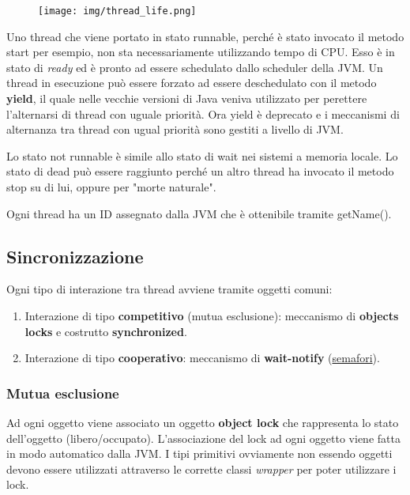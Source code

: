 \documentclass{article}
\begin{document}
\begin{figure}[h!]
    \begin{center}
        \texttt{[image: img/thread\_life.png]}     
    \end{center}
\end{figure}

\noindent Uno thread che viene portato in stato runnable, perché è stato invocato il metodo start per esempio, non sta necessariamente utilizzando tempo di CPU. Esso è 
in stato di \textit{ready} ed è pronto ad essere schedulato dallo scheduler della JVM. Un thread in esecuzione può essere forzato ad essere deschedulato con il metodo \textbf{yield},
il quale nelle vecchie versioni di Java veniva utilizzato per perettere l'alternarsi di thread con uguale priorità. Ora yield è deprecato e i meccanismi di alternanza tra thread 
con ugual priorità sono gestiti a livello di JVM.

\noindent Lo stato not runnable è simile allo stato di wait nei sistemi a memoria locale. Lo stato di dead può essere raggiunto perché un altro thread ha invocato il metodo stop 
su di lui, oppure per "morte naturale".
\medskip

\noindent Ogni thread ha un ID assegnato dalla JVM che è ottenibile tramite getName().

\subsection{Sincronizzazione}
\noindent Ogni tipo di interazione tra thread avviene tramite oggetti comuni:
\begin{enumerate}
    \item Interazione di tipo \textbf{competitivo} (mutua esclusione): meccanismo di \textbf{objects locks} e costrutto \textbf{synchronized}.
    \item Interazione di tipo \textbf{cooperativo}: meccanismo di \textbf{wait-notify} (\underline{semafori}).
\end{enumerate}

\subsubsection{Mutua esclusione}
\noindent Ad ogni oggetto viene associato un oggetto \textbf{object lock} che rappresenta lo stato dell'oggetto (libero/occupato). L'associazione del lock ad ogni oggetto
 viene fatta in modo automatico dalla JVM. I tipi primitivi ovviamente non essendo oggetti devono essere utilizzati attraverso le corrette classi \textit{wrapper} per poter utilizzare
 i lock.
\end{document}
